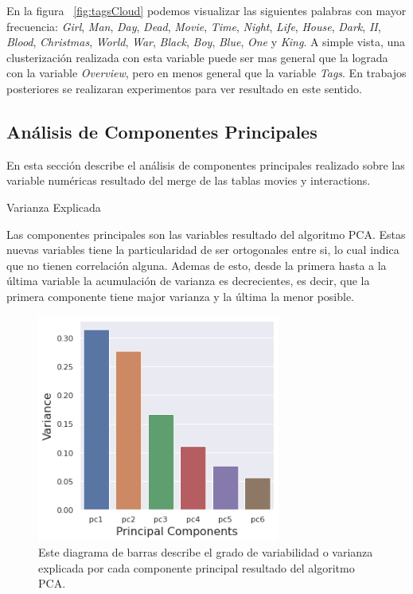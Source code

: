 \documentclass[11pt,a4paper,twoside]{thesis}
\begin{document}
En la figura ~\ref{fig:tagsCloud} podemos visualizar las siguientes palabras con mayor frecuencia: \textit{Girl}, \textit{Man}, \textit{Day}, \textit{Dead}, \textit{Movie}, \textit{Time}, \textit{Night}, \textit{Life}, \textit{House}, \textit{Dark}, \textit{II}, \textit{Blood}, \textit{Christmas}, \textit{World}, \textit{War}, \textit{Black}, \textit{Boy}, \textit{Blue}, \textit{One} y \textit{King}. A simple vista, una clusterización realizada con esta variable puede ser mas general que la lograda con la variable \textit{Overview}, pero en menos general que la variable \textit{Tags}. En trabajos posteriores se realizaran experimentos para ver resultado en este sentido.


\clearpage

\subsection{Análisis de Componentes Principales}

En esta sección describe el análisis de componentes principales realizado sobre las variable numéricas resultado del merge de las tablas movies y interactions.

\begin{description}
	\item[Varianza Explicada]
\end{description}

Las componentes principales son las variables resultado del algoritmo PCA. Estas nuevas variables tiene la particularidad de ser ortogonales entre si, lo cual indica que no tienen correlación alguna. Ademas de esto, desde la primera hasta a la última variable la acumulación de varianza es decrecientes, es decir, que la primera componente tiene major varianza y la última la menor posible. 


\begin{figure}[h!]
	\centering
	\includegraphics[width=8cm]{./images/PCA-Variance.png}
	\caption{Este diagrama de barras describe el grado de variabilidad o varianza explicada por cada componente principal resultado del algoritmo PCA.}
	\label{fig:explainedVariancePlot}
\end{figure}
\end{document}
